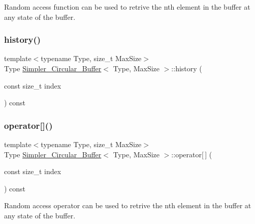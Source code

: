 Random access function can be used to retrive the nth element in the buffer at any state of the buffer. 

\mbox{\label{classSimpler__Circular__Buffer_afdd5b4da34472c721f46f354bfca2223}} 
\subsubsection{\texorpdfstring{history()}{history()}}
{\footnotesize\ttfamily template$<$typename Type, size\+\_\+t Max\+Size$>$ \\
Type \hyperlink{classSimpler__Circular__Buffer}{Simpler\+\_\+\+Circular\+\_\+\+Buffer}$<$ Type, Max\+Size $>$\+::history (\begin{DoxyParamCaption}\item[{const size\+\_\+t}]{index }\end{DoxyParamCaption}) const\hspace{0.3cm}{\ttfamily [inline]}}

\mbox{\label{classSimpler__Circular__Buffer_a4ce53bc8ad0d231e9d013c771191696a}} 
\subsubsection{\texorpdfstring{operator[]()}{operator[]()}}
{\footnotesize\ttfamily template$<$typename Type, size\+\_\+t Max\+Size$>$ \\
Type \hyperlink{classSimpler__Circular__Buffer}{Simpler\+\_\+\+Circular\+\_\+\+Buffer}$<$ Type, Max\+Size $>$\+::operator\mbox{[}$\,$\mbox{]} (\begin{DoxyParamCaption}\item[{const size\+\_\+t}]{index }\end{DoxyParamCaption}) const\hspace{0.3cm}{\ttfamily [inline]}}



Random access operator can be used to retrive the nth element in the buffer at any state of the buffer. 

